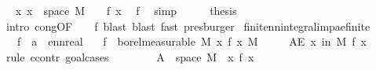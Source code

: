 \begin{isabellebody}
\ \isamarkupfalse%
\ {\isachardoublequoteopen}{\isasymAnd}x{\isachardot}{\kern0pt}\ x\ {\isasymin}\ space\ M\ {\isasymLongrightarrow}\ {}\ {\isasymle}\ f\ x{\isachardoublequoteclose}\ \isamarkupfalse%
\ f{\isacharparenleft}{\kern0pt}{}{\isacharparenright}{\kern0pt}\ \isamarkupfalse%
\ simp\isanewline
\ \ \isamarkupfalse%
\ \isamarkupfalse%
\ {\isacharquery}{\kern0pt}thesis\ \isamarkupfalse%
\ {\isacharparenleft}{\kern0pt}intro\ cong{\isacharbrackleft}{\kern0pt}OF\ {\isacharunderscore}{\kern0pt}\ {\isacharunderscore}{\kern0pt}\ {\isacharunderscore}{\kern0pt}\ f{\isacharparenleft}{\kern0pt}{}{\isacharcomma}{\kern0pt}{}{\isacharparenright}{\kern0pt}{\isacharbrackright}{\kern0pt}{\isacharcomma}{\kern0pt}\ blast{\isacharcomma}{\kern0pt}\ blast{\isacharcomma}{\kern0pt}\ fast{\isacharparenright}{\kern0pt}\ presburger{\isacharplus}{\kern0pt}\isanewline
{}\isamarkupfalse%
%
\endisatagproof
{\isafoldproof}%
%
\isadelimproof
\isanewline
%
\endisadelimproof
\isanewline
{}\isamarkupfalse%
\ finite{\isacharunderscore}{\kern0pt}nn{\isacharunderscore}{\kern0pt}integral{\isacharunderscore}{\kern0pt}imp{\isacharunderscore}{\kern0pt}ae{\isacharunderscore}{\kern0pt}finite{\isacharcolon}{\kern0pt}\isanewline
\ \ \ f\ {\isacharcolon}{\kern0pt}{\isacharcolon}{\kern0pt}\ {\isachardoublequoteopen}{\isacharprime}{\kern0pt}a\ {\isasymRightarrow}\ ennreal{\isachardoublequoteclose}\isanewline
\ \ \ {\isachardoublequoteopen}f\ {\isasymin}\ borel{\isacharunderscore}{\kern0pt}measurable\ M{\isachardoublequoteclose}\ {\isachardoublequoteopen}{\isacharparenleft}{\kern0pt}{\isasymintegral}\isactrlsup {\isacharplus}{\kern0pt}x{\isachardot}{\kern0pt}\ f\ x\ {\isasympartial}M{\isacharparenright}{\kern0pt}\ {\isacharless}{\kern0pt}\ {\isasyminfinity}{\isachardoublequoteclose}\isanewline
\ \ \ {\isachardoublequoteopen}AE\ x\ in\ M{\isachardot}{\kern0pt}\ f\ x\ {\isacharless}{\kern0pt}\ {\isasyminfinity}{\isachardoublequoteclose}\isanewline
%
\isadelimproof
%
\endisadelimproof
%
\isatagproof
{}\isamarkupfalse%
\ {\isacharparenleft}{\kern0pt}rule\ ccontr{\isacharcomma}{\kern0pt}\ goal{\isacharunderscore}{\kern0pt}cases{\isacharparenright}{\kern0pt}\isanewline
\ \ \isamarkupfalse%
\ {}\isanewline
\ \ \isamarkupfalse%
\ {\isacharquery}{\kern0pt}A\ {\isacharequal}{\kern0pt}\ {\isachardoublequoteopen}space\ M\ {\isasyminter}\ {\isacharbraceleft}{\kern0pt}x{\isachardot}{\kern0pt}\ f\ x\ {\isacharequal}{\kern0pt}\ {\isasyminfinity}{\isacharbraceright}{\kern0pt}{\isachardoublequoteclose}\isanewline

\end{isabellebody}
